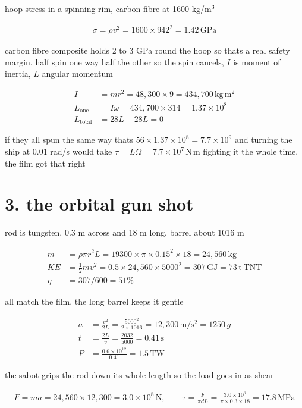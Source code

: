 \documentclass[11pt]{article}
\newcommand{\un}[1]{\,\mathrm{#1}}
\begin{document}
hoop stress in a spinning rim, carbon fibre at 1600 kg/m$^3$

\begin{align*}
\sigma = \rho v^2 = 1600 \times 942^2 = 1.42\un{GPa}
\end{align*}

carbon fibre composite holds 2 to 3 GPa round the hoop so thats a real safety margin. half spin one way half the other so the spin cancels, $I$ is moment of inertia, $L$ angular momentum

\begin{align*}
I &= m r^2 = 48{,}300 \times 9 = 434{,}700\un{kg\,m^2}\\
L_{\text{one}} &= I\omega = 434{,}700 \times 314 = 1.37\times10^8\\
L_{\text{total}} &= 28 L - 28 L = 0
\end{align*}

if they all spun the same way thats $56 \times 1.37\times10^8 = 7.7\times10^9$ and turning the ship at 0.01 rad/s would take $\tau = L\Omega = 7.7\times10^7\un{N\,m}$ fighting it the whole time. the film got that right

\section*{3. the orbital gun shot}

rod is tungsten, 0.3 m across and 18 m long, barrel about 1016 m

\begin{align*}
m &= \rho \pi r^2 L = 19300 \times \pi \times 0.15^2 \times 18 = 24{,}560\un{kg}\\
KE &= \tfrac12 m v^2 = 0.5 \times 24{,}560 \times 5000^2 = 307\un{GJ} = 73\un{t\ TNT}\\
\eta &= 307/600 = 51\%
\end{align*}

all match the film. the long barrel keeps it gentle

\begin{align*}
a &= \frac{v^2}{2L} = \frac{5000^2}{2 \times 1016} = 12{,}300\un{m/s^2} = 1250\,g\\
t &= \frac{2L}{v} = \frac{2032}{5000} = 0.41\un{s}\\
P &= \frac{0.6\times10^{12}}{0.41} = 1.5\un{TW}
\end{align*}

the sabot grips the rod down its whole length so the load goes in as shear

\begin{align*}
F = m a = 24{,}560 \times 12{,}300 = 3.0\times10^8\un{N}, \qquad
\tau = \frac{F}{\pi d L} = \frac{3.0\times10^8}{\pi \times 0.3 \times 18} = 17.8\un{MPa}
\end{align*}
\end{document}
